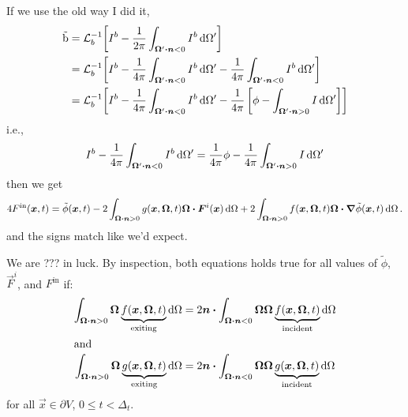 If we use the old way I did it,
\begin{align*}
  \mathrm{\tilde b} 
  &= \lopinv{b}{I^b
  - \frac{1}{2\pi} \int_{\vec{\Omega}' \vd \vec{n} < 0} I^b \ud \Omega'}
  \\
  &= \lopinv{b}{I^b
  - \frac{1}{4\pi} \int_{\vec{\Omega}' \vd \vec{n} < 0} I^b \ud \Omega'
  - \frac{1}{4\pi} \int_{\vec{\Omega}' \vd \vec{n} < 0} I^b \ud \Omega'}
  \\
  &= \lopinv{b}{I^b
  - \frac{1}{4\pi} \int_{\vec{\Omega}' \vd \vec{n} < 0} I^b \ud \Omega'
  - \frac{1}{4\pi}\left[ \phi - \int_{\vec{\Omega}' \vd \vec{n} > 0} I \ud \Omega' \right]
  }
\end{align*}
i.e.,
\begin{equation*}
  I^b
  - \frac{1}{4\pi} \int_{\bm{\Omega}' \bm{\cdot} \bm{n} < 0} I^b \mathop{}\!\mathrm{d} \Omega'
  = \frac{1}{4\pi} \phi
  - \frac{1}{4\pi}\int_{\bm{\Omega}' \bm{\cdot} \bm{n} > 0} I \mathop{}\!\mathrm{d} \Omega'
\end{equation*}
then we get
\begin{equation*}
 4 F^\mathrm{in}( \bm{x}, t)
  =
  \tilde \phi(\bm{x}, t)
- 2\int_{\bm{\Omega} \bm{\cdot} \bm{n} > 0} 
 g(\bm{x}, \bm{\Omega}, t) \bm{\Omega} \bm{\cdot} \bm{F}^i(\bm{x})
 \mathop{}\!\mathrm{d} \Omega
+ 2\int_{\bm{\Omega} \bm{\cdot} \bm{n} > 0} 
 f(\bm{x}, \bm{\Omega}, t) \bm{\Omega}\bm{\cdot} \bm{\nabla} \tilde\phi(\bm{x},t)
 \mathop{}\!\mathrm{d} \Omega\,.
\end{equation*}
and the signs match like we'd expect.

We are ??? in luck. By inspection, both equations holds true for all
values of
$\tilde\phi$, $\vec{F}^i$, and $F^\mathrm{in}$ if:
\begin{subequations} \label{eqs:bndyTransport}
\begin{align} \label{eq:bndyF}
  \int_{\bm{\Omega} \bm{\cdot} \bm{n} > 0} \bm{\Omega}
 \underbrace{f(\bm{x}, \bm{\Omega}, t)}_{\text{exiting}} \mathop{}\!\mathrm{d}\Omega
 &= 2 \bm{n} \bm{\cdot} \int_{\bm{\Omega} \bm{\cdot} \bm{n} < 0}
 \bm{\Omega} \bm{\Omega}
 \underbrace{f(\bm{x}, \bm{\Omega}, t)}_{\text{incident}} \mathop{}\!\mathrm{d}\Omega
 \\ \intertext{and} \label{eq:bndyG}
  \int_{\bm{\Omega} \bm{\cdot} \bm{n} > 0} \bm{\Omega}
 \underbrace{g(\bm{x}, \bm{\Omega}, t)}_{\text{exiting}} \mathop{}\!\mathrm{d}\Omega
 &= 2 \bm{n} \bm{\cdot} \int_{\bm{\Omega} \bm{\cdot} \bm{n} < 0}
 \bm{\Omega} \bm{\Omega}
 \underbrace{g(\bm{x}, \bm{\Omega}, t)}_{\text{incident}} \mathop{}\!\mathrm{d}\Omega
\end{align}
\end{subequations}
for all $\vec{x} \in \partial V$, $0\le t < \Delta_t$.

